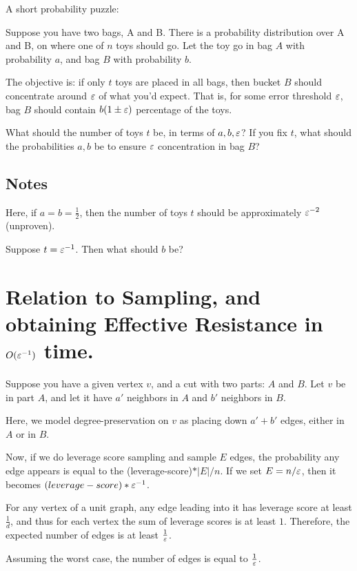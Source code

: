 

A short probability puzzle:

Suppose you have two bags, A and B. There is a probability
distribution over A and B, on where one of $n$ toys should go. Let the
toy go in bag $A$ with probability $a$, and bag $B$ with probability
$b$.

The objective is: if only $t$ toys are placed in all bags, then bucket $B$ should
concentrate around $\varepsilon$ of what you'd expect.  That is, for
some error threshold $\varepsilon$, bag $B$ should contain $b(1\pm\varepsilon)$
percentage of the toys.

What should the number of toys $t$ be, in terms
of $a, b, \varepsilon$? If you fix $t$, what should the probabilities $a, b$ be
to ensure $\varepsilon$ concentration in bag $B$?

\subsection{Notes}
Here, if $a = b = \frac{1}{2}$, then the number of toys $t$ should be
approximately $\varepsilon^{-2}$ (unproven).

Suppose $t = \varepsilon^{-1}$. Then what should $b$ be?


\section{Relation to Sampling, and obtaining Effective Resistance in
$O(\varepsilon^{-1})$ time.}
Suppose you have a given vertex $v$, and a cut with two parts: $A$ and
$B$.  Let $v$ be in part $A$, and let it have $a'$ neighbors in $A$ and
$b'$ neighbors in $B$.

Here, we model degree-preservation on $v$ as placing down $a'+b'$ edges,
either in $A$ or in $B$.

Now, if we do leverage score sampling and sample $E$ edges, the probability any edge appears
is equal to the (leverage-score)$*|E|/n$.  If we set $E = n/\varepsilon$, then
it becomes $(leverage-score)*\varepsilon^{-1}$.

For any vertex of a unit graph, any edge leading into it has leverage
score at least $\frac{1}{d}$, and thus for each vertex the sum of
leverage scores is at least $1$. Therefore, the expected
number of edges is at least $\frac{1}{\varepsilon}$. 

Assuming the worst case, the number of edges is equal to
$\frac{1}{\varepsilon}$.




